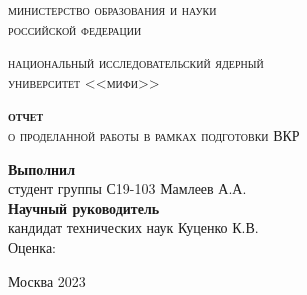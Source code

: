 \thispagestyle{empty}
\begin{center}
	\large
	{\scshape министерство образования и науки\\российской федерации}
	\vspace{1ex}
	
	{\scshape национальный исследовательский ядерный\\университет <<мифи>>}
	\vspace {5 cm}
	
	\Large
	{\scshape \textbf{отчет}\\о проделанной работы в рамках подготовки ВКР}
\end{center}

\vspace{3cm}
\hfill
\parbox{0.5\linewidth}{
\textbf{Выполнил}\\студент группы С19-103 Мамлеев А.А.\\[1ex]

\textbf{Научный руководитель}\\
кандидат технических наук Куценко К.В.\\[2ex]
Оценка: 
}

\vfill

\begin{center}
	Москва 2023
\end{center}